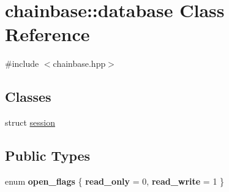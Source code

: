 \hypertarget{classchainbase_1_1database}{}\section{chainbase\+:\+:database Class Reference}
\label{classchainbase_1_1database}


{\ttfamily \#include $<$chainbase.\+hpp$>$}

\subsection*{Classes}
\begin{DoxyCompactItemize}
\item 
struct \mbox{\hyperlink{structchainbase_1_1database_1_1session}{session}}
\end{DoxyCompactItemize}
\subsection*{Public Types}
\begin{DoxyCompactItemize}
\item 
\mbox{\label{classchainbase_1_1database_a3d0148ef1d3bf633f3d0bfab420250ee}} 
enum {\bfseries open\+\_\+flags} \{ {\bfseries read\+\_\+only} = 0, 
{\bfseries read\+\_\+write} = 1
 \}
\end{DoxyCompactItemize}
